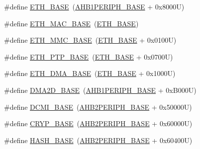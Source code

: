 \begin{DoxyCompactItemize}
\item 
\#define \hyperlink{group___peripheral__memory__map_gad965a7b1106ece575ed3da10c45c65cc}{E\+T\+H\+\_\+\+B\+A\+SE}~(\hyperlink{group___peripheral__memory__map_ga811a9a4ca17f0a50354a9169541d56c4}{A\+H\+B1\+P\+E\+R\+I\+P\+H\+\_\+\+B\+A\+SE} + 0x8000\+U)
\item 
\#define \hyperlink{group___peripheral__memory__map_ga3cf7005808feb61bff1fee01e50a711a}{E\+T\+H\+\_\+\+M\+A\+C\+\_\+\+B\+A\+SE}~(\hyperlink{group___peripheral__memory__map_gad965a7b1106ece575ed3da10c45c65cc}{E\+T\+H\+\_\+\+B\+A\+SE})
\item 
\#define \hyperlink{group___peripheral__memory__map_ga4946f2b3b03f7998343ac1778fbcf725}{E\+T\+H\+\_\+\+M\+M\+C\+\_\+\+B\+A\+SE}~(\hyperlink{group___peripheral__memory__map_gad965a7b1106ece575ed3da10c45c65cc}{E\+T\+H\+\_\+\+B\+A\+SE} + 0x0100\+U)
\item 
\#define \hyperlink{group___peripheral__memory__map_gaa0f60b922aeb7275c785cbaa8f94ecf0}{E\+T\+H\+\_\+\+P\+T\+P\+\_\+\+B\+A\+SE}~(\hyperlink{group___peripheral__memory__map_gad965a7b1106ece575ed3da10c45c65cc}{E\+T\+H\+\_\+\+B\+A\+SE} + 0x0700\+U)
\item 
\#define \hyperlink{group___peripheral__memory__map_gace2114e1b37c1ba88d60f3e831b67e93}{E\+T\+H\+\_\+\+D\+M\+A\+\_\+\+B\+A\+SE}~(\hyperlink{group___peripheral__memory__map_gad965a7b1106ece575ed3da10c45c65cc}{E\+T\+H\+\_\+\+B\+A\+SE} + 0x1000\+U)
\item 
\#define \hyperlink{group___peripheral__memory__map_gacec66385fd1604e69584eb19a0aaa303}{D\+M\+A2\+D\+\_\+\+B\+A\+SE}~(\hyperlink{group___peripheral__memory__map_ga811a9a4ca17f0a50354a9169541d56c4}{A\+H\+B1\+P\+E\+R\+I\+P\+H\+\_\+\+B\+A\+SE} + 0x\+B000\+U)
\item 
\#define \hyperlink{group___peripheral__memory__map_ga55b794507e021135486de57129a2505c}{D\+C\+M\+I\+\_\+\+B\+A\+SE}~(\hyperlink{group___peripheral__memory__map_gaeedaa71d22a1948492365e2cd26cfd46}{A\+H\+B2\+P\+E\+R\+I\+P\+H\+\_\+\+B\+A\+SE} + 0x50000\+U)
\item 
\#define \hyperlink{group___peripheral__memory__map_ga019f3ad3b3212e56b45984efd8b8efef}{C\+R\+Y\+P\+\_\+\+B\+A\+SE}~(\hyperlink{group___peripheral__memory__map_gaeedaa71d22a1948492365e2cd26cfd46}{A\+H\+B2\+P\+E\+R\+I\+P\+H\+\_\+\+B\+A\+SE} + 0x60000\+U)
\item 
\#define \hyperlink{group___peripheral__memory__map_ga398d121ca28c3f0f90a140b62184e242}{H\+A\+S\+H\+\_\+\+B\+A\+SE}~(\hyperlink{group___peripheral__memory__map_gaeedaa71d22a1948492365e2cd26cfd46}{A\+H\+B2\+P\+E\+R\+I\+P\+H\+\_\+\+B\+A\+SE} + 0x60400\+U)

\end{DoxyCompactItemize}
